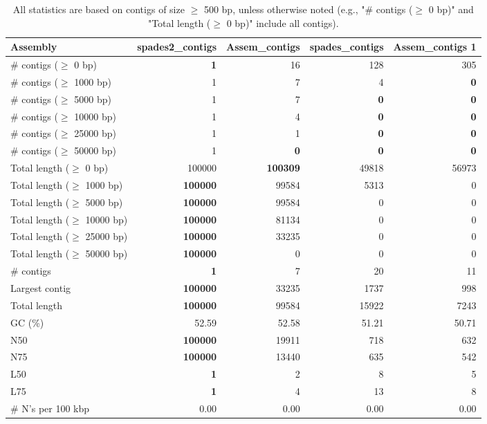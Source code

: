 \documentclass[12pt,a4paper]{article}
\begin{document}
\begin{table}[ht]
\begin{center}
\caption{All statistics are based on contigs of size $\geq$ 500 bp, unless otherwise noted (e.g., "\# contigs ($\geq$ 0 bp)" and "Total length ($\geq$ 0 bp)" include all contigs).}
\begin{tabular}{|l*{4}{|r}|}
\hline
Assembly & spades2\_contigs & Assem\_contigs & spades\_contigs & Assem\_contigs 1 \\ \hline
\# contigs ($\geq$ 0 bp) & {\bf 1} & 16 & 128 & 305 \\ \hline
\# contigs ($\geq$ 1000 bp) & 1 & 7 & 4 & {\bf 0} \\ \hline
\# contigs ($\geq$ 5000 bp) & 1 & 7 & {\bf 0} & {\bf 0} \\ \hline
\# contigs ($\geq$ 10000 bp) & 1 & 4 & {\bf 0} & {\bf 0} \\ \hline
\# contigs ($\geq$ 25000 bp) & 1 & 1 & {\bf 0} & {\bf 0} \\ \hline
\# contigs ($\geq$ 50000 bp) & 1 & {\bf 0} & {\bf 0} & {\bf 0} \\ \hline
Total length ($\geq$ 0 bp) & 100000 & {\bf 100309} & 49818 & 56973 \\ \hline
Total length ($\geq$ 1000 bp) & {\bf 100000} & 99584 & 5313 & 0 \\ \hline
Total length ($\geq$ 5000 bp) & {\bf 100000} & 99584 & 0 & 0 \\ \hline
Total length ($\geq$ 10000 bp) & {\bf 100000} & 81134 & 0 & 0 \\ \hline
Total length ($\geq$ 25000 bp) & {\bf 100000} & 33235 & 0 & 0 \\ \hline
Total length ($\geq$ 50000 bp) & {\bf 100000} & 0 & 0 & 0 \\ \hline
\# contigs & {\bf 1} & 7 & 20 & 11 \\ \hline
Largest contig & {\bf 100000} & 33235 & 1737 & 998 \\ \hline
Total length & {\bf 100000} & 99584 & 15922 & 7243 \\ \hline
GC (\%) & 52.59 & 52.58 & 51.21 & 50.71 \\ \hline
N50 & {\bf 100000} & 19911 & 718 & 632 \\ \hline
N75 & {\bf 100000} & 13440 & 635 & 542 \\ \hline
L50 & {\bf 1} & 2 & 8 & 5 \\ \hline
L75 & {\bf 1} & 4 & 13 & 8 \\ \hline
\# N's per 100 kbp & 0.00 & 0.00 & 0.00 & 0.00 \\ \hline
\end{tabular}
\end{center}
\end{table}
\end{document}
